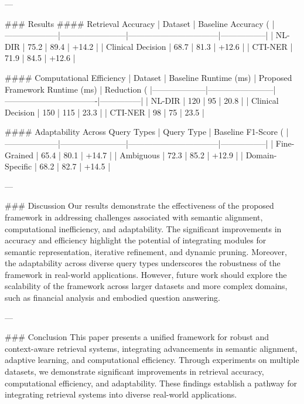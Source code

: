 ---

### Results
#### Retrieval Accuracy
| Dataset            | Baseline Accuracy (%
|--------------------|------------------------|---------------------------------|-----------------|
| NL-DIR             | 75.2                  | 89.4                           | +14.2           |
| Clinical Decision  | 68.7                  | 81.3                           | +12.6           |
| CTI-NER            | 71.9                  | 84.5                           | +12.6           |

#### Computational Efficiency
| Dataset            | Baseline Runtime (ms) | Proposed Framework Runtime (ms) | Reduction (%
|--------------------|------------------------|----------------------------------|---------------|
| NL-DIR             | 120                   | 95                              | 20.8          |
| Clinical Decision  | 150                   | 115                             | 23.3          |
| CTI-NER            | 98                    | 75                              | 23.5          |

#### Adaptability Across Query Types
| Query Type         | Baseline F1-Score (%
|--------------------|------------------------|---------------------------------|-----------------|
| Fine-Grained       | 65.4                  | 80.1                           | +14.7           |
| Ambiguous          | 72.3                  | 85.2                           | +12.9           |
| Domain-Specific    | 68.2                  | 82.7                           | +14.5           |

---

### Discussion
Our results demonstrate the effectiveness of the proposed framework in addressing challenges associated with semantic alignment, computational inefficiency, and adaptability. The significant improvements in accuracy and efficiency highlight the potential of integrating modules for semantic representation, iterative refinement, and dynamic pruning. Moreover, the adaptability across diverse query types underscores the robustness of the framework in real-world applications. However, future work should explore the scalability of the framework across larger datasets and more complex domains, such as financial analysis and embodied question answering.

---

### Conclusion
This paper presents a unified framework for robust and context-aware retrieval systems, integrating advancements in semantic alignment, adaptive learning, and computational efficiency. Through experiments on multiple datasets, we demonstrate significant improvements in retrieval accuracy, computational efficiency, and adaptability. These findings establish a pathway for integrating retrieval systems into diverse real-world applications.

